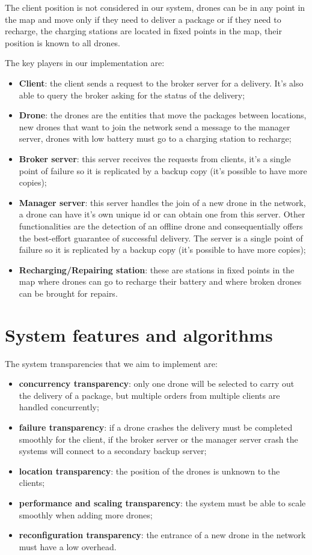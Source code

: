 \documentclass[a4paper, oneside]{memoir}
\begin{document}
The client position is not considered in our system, drones can be in any point in the map and move only if they need to deliver a package or if they need to recharge, the charging stations are located in fixed points in the map, their position is known to all drones.

The key players in our implementation are:
\begin{itemize}
\item \textbf{Client}: the client sends a request to the broker server for a delivery. It's also able to query the broker asking for the status of the delivery;
\item \textbf{Drone}: the drones are the entities that move the packages between locations, new drones that want to join the network send a message to the manager server, drones with low battery must go to a charging station to recharge;
\item \textbf{Broker server}: this server receives the requests from clients, it's a single point of failure so it is replicated by a backup copy (it's possible to have more copies);
\item \textbf{Manager server}: this server handles the join of a new drone in the network, a drone can have it's own unique id or can obtain one from this server. Other functionalities are the detection of an offline drone and consequentially offers the best-effort guarantee of successful delivery. The server is a single point of failure so it is replicated by a backup copy (it's possible to have more copies);
\item \textbf{Recharging/Repairing station}: these are stations in fixed points in the map where drones can go to recharge their battery and where broken drones can be brought for repairs.
\end{itemize}


\section{System features and algorithms}


The system transparencies that we aim to implement are:
\begin{itemize}
	\item \textbf{concurrency transparency}: only one drone will be selected to carry out the delivery of a package, but multiple orders from multiple clients are handled concurrently;
	\item \textbf{failure transparency}: if a drone crashes the delivery must be completed smoothly for the client, if the broker server or the manager server crash the systems will connect to a secondary backup server;
	\item \textbf{location transparency}: the position of the drones is unknown to the clients;
	\item \textbf{performance and scaling transparency}: the system must be able to scale smoothly when adding more drones;
	\item \textbf{reconfiguration transparency}: the entrance of a new drone in the network must have a low overhead.
\end{itemize}
\end{document}
